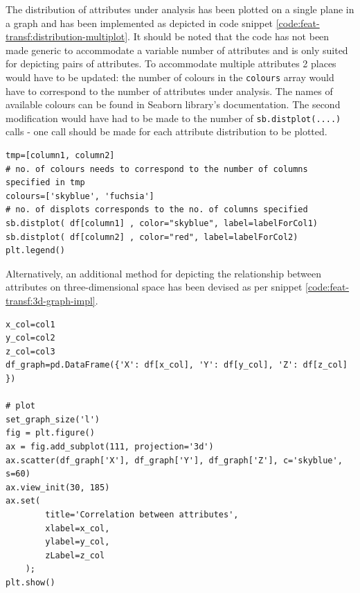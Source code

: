 The distribution of attributes under analysis has been plotted on a single plane in a graph and has been implemented as depicted in code snippet \ref{code:feat-transf:distribution-multiplot}. It should be noted that the code has not been made generic to accommodate a variable number of attributes and is only suited for depicting pairs of attributes. To accommodate multiple attributes 2 places would have to be updated: the number of colours in the \texttt{colours} array would have to correspond to the number of attributes under analysis. The names of available colours can be found in Seaborn library's documentation. The second modification would have had to be made to the number of \texttt{sb.distplot(....)} calls - one call should be made for each attribute distribution to be plotted.
\begin{code}
\label{code:feat-transf:distribution-multiplot}
\begin{verbatim}
tmp=[column1, column2]
# no. of colours needs to correspond to the number of columns specified in tmp
colours=['skyblue', 'fuchsia'] 
# no. of displots corresponds to the no. of columns specified
sb.distplot( df[column1] , color="skyblue", label=labelForCol1)
sb.distplot( df[column2] , color="red", label=labelForCol2)
plt.legend()
\end{verbatim}
\end{code}

Alternatively, an additional method for depicting the relationship between attributes on three-dimensional space has been devised as per snippet \ref{code:feat-transf:3d-graph-impl}.

\begin{code}
\label{code:feat-transf:3d-graph-impl}
\begin{verbatim}
x_col=col1
y_col=col2
z_col=col3
df_graph=pd.DataFrame({'X': df[x_col], 'Y': df[y_col], 'Z': df[z_col] })
 
# plot
set_graph_size('l')
fig = plt.figure()
ax = fig.add_subplot(111, projection='3d')
ax.scatter(df_graph['X'], df_graph['Y'], df_graph['Z'], c='skyblue', s=60)
ax.view_init(30, 185)
ax.set(
        title='Correlation between attributes',
        xlabel=x_col,
        ylabel=y_col,
        zLabel=z_col
    );
plt.show()
\end{verbatim}
\end{code}

\FloatBarrier

